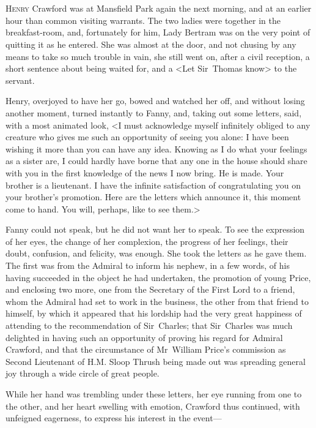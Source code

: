 \chapter[Chapter \thechapter]{} 

 \lettrine[lraise=0.3]{H}{enry} Crawford was at Mansfield Park again the next morning, and at an earlier hour than common visiting warrants. The two ladies were together in the breakfast-room, and, fortunately for him, Lady Bertram was on the very point of quitting it as he entered. She was almost at the door, and not chusing by any means to take so much trouble in vain, she still went on, after a civil reception, a short sentence about being waited for, and a <Let Sir~Thomas know> to the servant.

Henry, overjoyed to have her go, bowed and watched her off, and without losing another moment, turned instantly to Fanny, and, taking out some letters, said, with a most animated look, <I must acknowledge myself infinitely obliged to any creature who gives me such an opportunity of seeing you alone: I have been wishing it more than you can have any idea. Knowing as I do what your feelings as a sister are, I could hardly have borne that any one in the house should share with you in the first knowledge of the news I now bring. He is made. Your brother is a lieutenant. I have the infinite satisfaction of congratulating you on your brother's promotion. Here are the letters which announce it, this moment come to hand. You will, perhaps, like to see them.>

Fanny could not speak, but he did not want her to speak. To see the expression of her eyes, the change of her complexion, the progress of her feelings, their doubt, confusion, and felicity, was enough. She took the letters as he gave them. The first was from the Admiral to inform his nephew, in a few words, of his having succeeded in the object he had undertaken, the promotion of young Price, and enclosing two more, one from the Secretary of the First Lord to a friend, whom the Admiral had set to work in the business, the other from that friend to himself, by which it appeared that his lordship had the very great happiness of attending to the recommendation of Sir~Charles; that Sir~Charles was much delighted in having such an opportunity of proving his regard for Admiral Crawford, and that the circumstance of Mr~William Price's commission as Second Lieutenant of H.M. Sloop Thrush being made out was spreading general joy through a wide circle of great people.

While her hand was trembling under these letters, her eye running from one to the other, and her heart swelling with emotion, Crawford thus continued, with unfeigned eagerness, to express his interest in the event—


